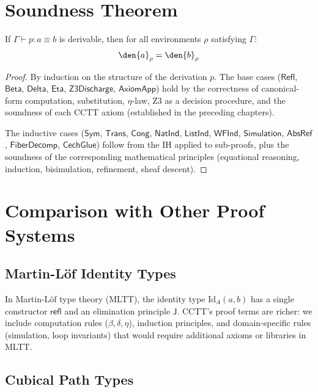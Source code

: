 \section{Soundness Theorem}

\begin{theorem}
\label{thm:soundness}
If $\Gamma \vdash p : a \equiv b$ is derivable, then for all
environments $\rho$ satisfying $\Gamma$:
\[
  \den{a}_\rho = \den{b}_\rho
\]
\end{theorem}

\begin{proof}
By induction on the structure of the derivation $p$.
The base cases ($\mathsf{Refl}$, $\mathsf{Beta}$, $\mathsf{Delta}$,
$\mathsf{Eta}$, $\mathsf{Z3Discharge}$, $\mathsf{AxiomApp}$) hold
by the correctness of canonical-form computation, substitution,
$\eta$-law, Z3 as a decision procedure, and the soundness of each
CCTT axiom (established in the preceding chapters).

The inductive cases ($\mathsf{Sym}$, $\mathsf{Trans}$, $\mathsf{Cong}$,
$\mathsf{NatInd}$, $\mathsf{ListInd}$, $\mathsf{WFInd}$,
$\mathsf{Simulation}$, $\mathsf{AbsRef}$, $\mathsf{FiberDecomp}$,
$\mathsf{CechGlue}$) follow from the IH applied to sub-proofs, plus
the soundness of the corresponding mathematical principles (equational
reasoning, induction, bisimulation, refinement, sheaf descent).
\end{proof}


\section{Comparison with Other Proof Systems}

\subsection{Martin-L\"of Identity Types}

In Martin-L\"of type theory (MLTT), the identity type $\mathrm{Id}_A(a,b)$
has a single constructor $\mathsf{refl}$ and an elimination principle
$\mathsf{J}$.  CCTT's proof terms are richer: we include computation
rules ($\beta, \delta, \eta$), induction principles, and domain-specific
rules (simulation, loop invariants) that would require additional axioms
or libraries in MLTT.

\subsection{Cubical Path Types}

